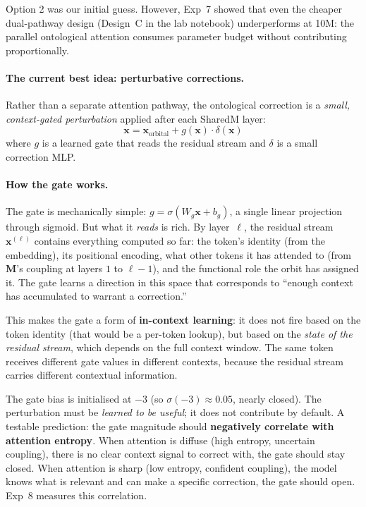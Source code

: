 \documentclass[11pt, a4paper]{article}
\newcommand{\M}{\mathbf{M}}
\newcommand{\x}{\mathbf{x}}
\theoremstyle{remark}
\begin{document}
Option 2 was our initial guess.
However, Exp~7 showed that even the cheaper dual-pathway design (Design~C in the lab notebook) underperforms at 10M: the parallel ontological attention consumes parameter budget without contributing proportionally.

\paragraph{The current best idea: perturbative corrections.}
Rather than a separate attention pathway, the ontological correction is a \emph{small, context-gated perturbation} applied after each SharedM layer:
\[
    \x = \x_{\text{orbital}} + g(\x) \cdot \delta(\x)
\]
where $g$ is a learned gate that reads the residual stream and $\delta$ is a small correction MLP.

\paragraph{How the gate works.}
The gate is mechanically simple: $g = \sigma(W_g \x + b_g)$, a single linear projection through sigmoid.
But what it \emph{reads} is rich.
By layer~$\ell$, the residual stream $\x^{(\ell)}$ contains everything computed so far: the token's identity (from the embedding), its positional encoding, what other tokens it has attended to (from $\M$'s coupling at layers $1$ to $\ell{-}1$), and the functional role the orbit has assigned it.
The gate learns a direction in this space that corresponds to ``enough context has accumulated to warrant a correction.''

This makes the gate a form of \textbf{in-context learning}: it does not fire based on the token identity (that would be a per-token lookup), but based on the \emph{state of the residual stream}, which depends on the full context window.
The same token receives different gate values in different contexts, because the residual stream carries different contextual information.

The gate bias is initialised at $-3$ (so $\sigma(-3) \approx 0.05$, nearly closed).
The perturbation must be \emph{learned to be useful}; it does not contribute by default.
A testable prediction: the gate magnitude should \textbf{negatively correlate with attention entropy}.
When attention is diffuse (high entropy, uncertain coupling), there is no clear context signal to correct with, the gate should stay closed.
When attention is sharp (low entropy, confident coupling), the model knows what is relevant and can make a specific correction, the gate should open.
Exp~8 measures this correlation.
\end{document}
